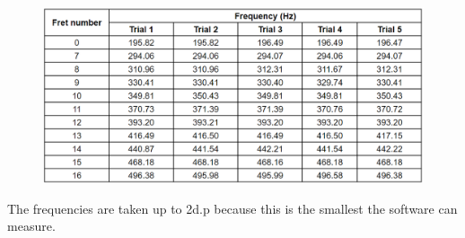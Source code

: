 \begin{figure}[!htb]
    \includegraphics[width = \textwidth]{./ee/raw_table.png}
\end{figure}
The frequencies are taken up to 2d.p because this is the smallest the software can measure.